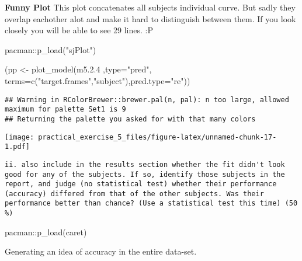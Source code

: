 \documentclass[
]{article}
\newenvironment{Shaded}{\begin{snugshade}}{\end{snugshade}}
\newcommand{\AttributeTok}[1]{\textcolor[rgb]{0.77,0.63,0.00}{#1}}
\newcommand{\FloatTok}[1]{\textcolor[rgb]{0.00,0.00,0.81}{#1}}
\newcommand{\FunctionTok}[1]{\textcolor[rgb]{0.00,0.00,0.00}{#1}}
\newcommand{\NormalTok}[1]{#1}
\newcommand{\OtherTok}[1]{\textcolor[rgb]{0.56,0.35,0.01}{#1}}
\newcommand{\SpecialCharTok}[1]{\textcolor[rgb]{0.00,0.00,0.00}{#1}}
\newcommand{\StringTok}[1]{\textcolor[rgb]{0.31,0.60,0.02}{#1}}
\begin{document}
\textbf{Funny Plot} This plot concatenates all subjects individual
curve. But sadly they overlap eachother alot and make it hard to
distinguish between them. If you look closely you will be able to see 29
lines. :P

\begin{Shaded}
\begin{Highlighting}[]
\NormalTok{pacman}\SpecialCharTok{::}\FunctionTok{p\_load}\NormalTok{(}\StringTok{"sjPlot"}\NormalTok{)}

\NormalTok{(pp }\OtherTok{\textless{}{-}} \FunctionTok{plot\_model}\NormalTok{(m5.}\FloatTok{2.4}\NormalTok{ ,}\AttributeTok{type=}\StringTok{"pred"}\NormalTok{,}
       \AttributeTok{terms=}\FunctionTok{c}\NormalTok{(}\StringTok{"target.frames"}\NormalTok{,}\StringTok{"subject"}\NormalTok{),}\AttributeTok{pred.type=}\StringTok{"re"}\NormalTok{))}
\end{Highlighting}
\end{Shaded}

\begin{verbatim}
## Warning in RColorBrewer::brewer.pal(n, pal): n too large, allowed maximum for palette Set1 is 9
## Returning the palette you asked for with that many colors
\end{verbatim}

\texttt{[image: practical\_exercise\_5\_files/figure-latex/unnamed-chunk-17-1.pdf]}

\begin{verbatim}
ii. also include in the results section whether the fit didn't look good for any of the subjects. If so, identify those subjects in the report, and judge (no statistical test) whether their performance (accuracy) differed from that of the other subjects. Was their performance better than chance? (Use a statistical test this time) (50 %)  
\end{verbatim}

\begin{Shaded}
\begin{Highlighting}[]
\NormalTok{pacman}\SpecialCharTok{::}\FunctionTok{p\_load}\NormalTok{(caret)}
\end{Highlighting}
\end{Shaded}

Generating an idea of accuracy in the entire data-set.
\end{document}
